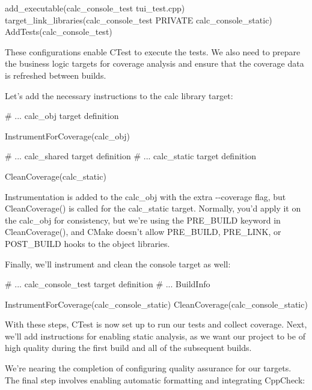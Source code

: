 \begin{cmake}
add_executable(calc_console_test tui_test.cpp)
target_link_libraries(calc_console_test
                      PRIVATE calc_console_static)
AddTests(calc_console_test)
\end{cmake}

These configurations enable CTest to execute the tests. We also need to prepare the business logic targets for coverage analysis and ensure that the coverage data is refreshed between builds.

Let’s add the necessary instructions to the calc library target:


\begin{cmake}
# ... calc_obj target definition

InstrumentForCoverage(calc_obj)

# ... calc_shared target definition
# ... calc_static target definition

CleanCoverage(calc_static)
\end{cmake}

Instrumentation is added to the calc\_obj with the extra -{}-coverage flag, but CleanCoverage() is called for the calc\_static target. Normally, you’d apply it on the calc\_obj for consistency, but we’re using the PRE\_BUILD keyword in CleanCoverage(), and CMake doesn’t allow PRE\_BUILD, PRE\_LINK, or POST\_BUILD hooks to the object libraries.

Finally, we’ll instrument and clean the console target as well:


\begin{cmake}
# ... calc_console_test target definition
# ... BuildInfo

InstrumentForCoverage(calc_console_static)
CleanCoverage(calc_console_static)
\end{cmake}

With these steps, CTest is now set up to run our tests and collect coverage. Next, we’ll add instructions for enabling static analysis, as we want our project to be of high quality during the first build and all of the subsequent builds.


We’re nearing the completion of configuring quality assurance for our targets. The final step involves enabling automatic formatting and integrating CppCheck:

